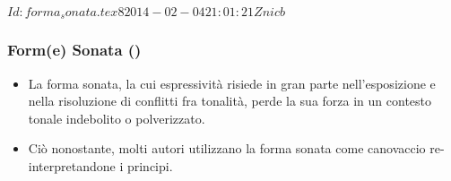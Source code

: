 %
%
\svnInfo $Id: forma_sonata.tex 8 2014-02-04 21:01:21Z nicb $

\setcounter{ms}{0}
\begin{frame}
    \frametitle{Form(e) Sonata ()}

    \begin{itemize}

        \item La forma sonata, la cui espressivit\`a risiede
              in gran parte nell'esposizione e nella risoluzione
              di conflitti fra tonalit\`a, perde la sua forza
              in un contesto tonale indebolito o polverizzato.

        \item Ci\`o nonostante, molti autori utilizzano
              la forma sonata come canovaccio
              re-interpretandone i principi.

    \end{itemize}

\end{frame}


